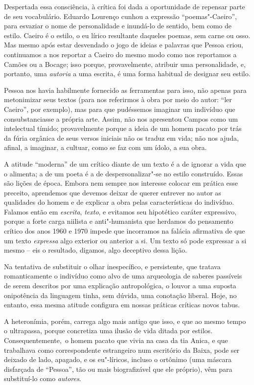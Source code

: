 Despertada essa consciência, à crítica foi dada a oportunidade de
repensar parte de seu vocabulário. Eduardo Lourenço cunhou a expressão
``poemas"-Caeiro'', para esvaziar o nome de personalidade e inundá-lo de
sentido, bem como de estilo. Caeiro é o estilo, o eu lírico resultante
daqueles poemas, sem carne ou osso. Mas mesmo após estar desvendado o
jogo de ideias e palavras que Pessoa criou, continuamos a nos reportar a
Caeiro do mesmo modo como nos reportamos a Camões ou a Bocage; isso
porque, provavelmente, atribuir uma personalidade, e, portanto, uma
\emph{autoria} a uma escrita, é uma forma habitual de designar seu
estilo.

Pessoa nos havia habilmente fornecido as ferramentas para isso, não
apenas para metonimizar seus textos (para nos referirmos à obra por meio
do autor: ``ler Caeiro'', por exemplo), mas para que pudéssemos imaginar
um indivíduo que consubstanciasse a própria arte. Assim, não nos
apresentou Campos como um intelectual tímido; provavelmente porque a
ideia de um homem pacato por trás da fúria orgânica de seus versos
iniciais não os traduz em vida; não nos ajuda, afinal, a imaginar, a
cultuar, como se faz com um ídolo, a sua obra.

A atitude ``moderna'' de um crítico diante de um texto é a de ignorar a
vida que o alimenta; a de um poeta é a de despersonalizar"-se no estilo
construído. Essas são lições de época. Embora nem sempre nos interesse
colocar em prática esse preceito, aprendemos que devemos deixar de
querer entrever no autor as qualidades do homem e de explicar a obra
pelas características do indivíduo. Falamos então em \emph{escrita},
\emph{texto}, e evitamos seu hipotético caráter expressivo, porque a
forte carga niilista e anti"-humanista que herdamos do pensamento crítico
dos anos 1960 e 1970 impede que incorramos na falácia afirmativa de que
um texto \emph{expressa} algo exterior ou anterior a si. Um texto só
pode expressar a si mesmo -- eis o resultado, digamos, algo deceptivo
dessa lição.

Na tentativa de substituir o olhar inespecífico, e persistente, que
tratava romanticamente o indivíduo como alvo de uma arqueologia de
saberes passíveis de serem descritos por uma explicação antropológica, o
louvor a uma suposta onipotência da linguagem tinha, sem dúvida, uma
conotação liberal. Hoje, no entanto, essa mesma atitude configura em
nossas práticas críticas novos tabus.

A heteronímia, porém, carrega algo mais antigo que isso, e que ao mesmo
tempo o ultrapassa, porque concretiza uma ilusão de vida ditada por
estilos. Consequentemente,~o homem pacato que vivia na casa da tia
Anica, e que trabalhava como correspondente estrangeiro num escritório
da Baixa, pode ser deixado de lado, apagado, e os eu"-líricos, incluso o
ortônimo (uma máscara disfarçada de ``Pessoa'', tão ou mais
biografizável que ele próprio), vêm para substituí-lo como
\emph{autores}.

